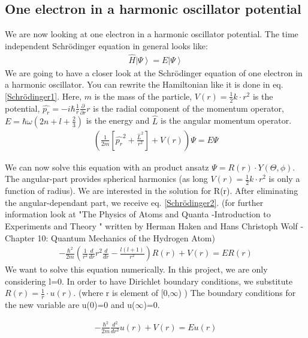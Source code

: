 \documentclass[10pt,a4paper]{article}
\begin{document}
\subsection{One electron in a harmonic oscillator potential \label{one electron in harm osc}}
We are now looking at one electron in a harmonic oscillator potential. 
The time independent Schrödinger equation in general looks like:
\begin{align}
	\hat{H} \left|\Psi \right> = E \left|\Psi \right>
\end{align}
We are going to have a closer look at the Schrödinger equation of one electron in a harmonic oscillator. 
You can rewrite the Hamiltonian like it is done in eq. \eqref{Schrödinger1}. Here, $m$ is the mass of the particle, $V(r)=\frac{1}{2}k \cdot r^2$ is the potential, $\hat{p_r}=-i \hbar \frac{1}{r} \frac{\partial}{\partial r} r$ is the radial component of the momentum operator, $E=\hbar \omega (2n+l+\frac{2}{3})$ is the energy and $\hat{L}$ is the angular momentum operator. 
\begin{align}
	\left( \frac{1}{2m} \left[ \hat{p_r}^2 + \frac{\hat{L}^2}{r^2}\right] +V(r) \right) \Psi = E \Psi \label{Schrödinger1}
\end{align}

We can now solve this equation with an product ansatz $\Psi= R(r) \cdot Y(\Theta, \phi )$. The angular-part provides spherical harmonics (as long $V(r)=\frac{1}{2}k \cdot r^2$ is only a function of radius). We are interested in the solution for R(r). After eliminating the angular-dependant part, we receive eq. \eqref{Schrödinger2}. (for further information look at "The Physics of Atoms and Quanta -Introduction to Experiments and Theory " written by Herman Haken and Hans Christoph Wolf - Chapter 10: Quantum Mechanics of the Hydrogen Atom)
\begin{align}
	-\frac{\hbar^2}{2 m} \left( \frac{1}{r^2} \frac{d}{dr}r^2 \frac{d}{dr}-\frac{l(l+1)}{r^2} \right) R(r)+ V(r) = E R(r) \label{Schrödinger2}
\end{align}
We want to solve this equation numerically. In this project, we are only considering l=0.
In order to have Dirichlet boundary conditions, we substitute $R(r)=\frac{1}{r}\cdot u(r)$. (where r is element of [0,$\infty$)  ) The boundary conditions for the new variable are u(0)=0 and u($\infty$)=0. 

\begin{align}
	-\frac{\hbar^2}{2 m}  \frac{d^2}{dr^2} u(r)+ V(r) = E u(r) \label{Schrödinger3}
\end{align}
\end{document}
